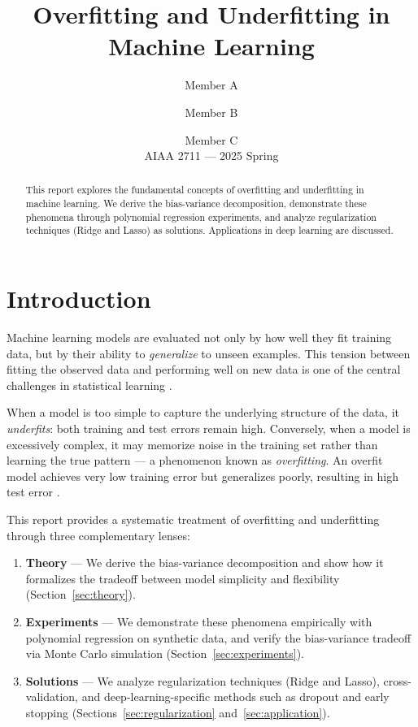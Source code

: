 \documentclass[12pt, a4paper]{article}
\title{Overfitting and Underfitting in Machine Learning}
\author{
  Member A \and Member B \and Member C \\
  \small AIAA 2711 --- 2025 Spring
}
\date{}
\begin{document}
\maketitle

\begin{abstract}
This report explores the fundamental concepts of overfitting and underfitting in
machine learning. We derive the bias-variance decomposition, demonstrate these
phenomena through polynomial regression experiments, and analyze regularization
techniques (Ridge and Lasso) as solutions. Applications in deep learning are discussed.
\end{abstract}

\section{Introduction}
\label{sec:introduction}

Machine learning models are evaluated not only by how well they fit training data, but
by their ability to \emph{generalize} to unseen examples. This tension between fitting
the observed data and performing well on new data is one of the central challenges in
statistical learning \citep{bishop2006pattern}.

When a model is too simple to capture the underlying structure of the data, it
\emph{underfits}: both training and test errors remain high. Conversely, when a model
is excessively complex, it may memorize noise in the training set rather than learning
the true pattern --- a phenomenon known as \emph{overfitting}. An overfit model achieves
very low training error but generalizes poorly, resulting in high test error
\citep{ying2019overview}.

This report provides a systematic treatment of overfitting and underfitting through
three complementary lenses:
\begin{enumerate}
    \item \textbf{Theory} --- We derive the bias-variance decomposition and show how it
          formalizes the tradeoff between model simplicity and flexibility
          (Section~\ref{sec:theory}).
    \item \textbf{Experiments} --- We demonstrate these phenomena empirically with
          polynomial regression on synthetic data, and verify the bias-variance
          tradeoff via Monte Carlo simulation (Section~\ref{sec:experiments}).
    \item \textbf{Solutions} --- We analyze regularization techniques (Ridge and Lasso),
          cross-validation, and deep-learning-specific methods such as dropout and early
          stopping (Sections~\ref{sec:regularization} and~\ref{sec:application}).
\end{enumerate}
\end{document}
